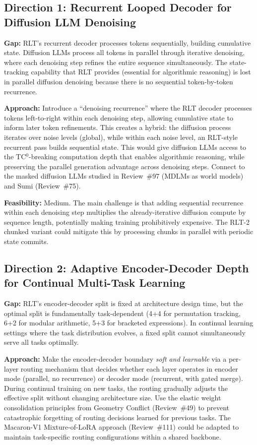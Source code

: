 \documentclass[11pt,a4paper]{article}
\begin{document}
\subsection{Direction 1: Recurrent Looped Decoder for Diffusion LLM Denoising}
\textbf{Gap:} RLT's recurrent decoder processes tokens sequentially, building cumulative state. Diffusion LLMs process all tokens in parallel through iterative denoising, where each denoising step refines the entire sequence simultaneously. The state-tracking capability that RLT provides (essential for algorithmic reasoning) is lost in parallel diffusion denoising because there is no sequential token-by-token recurrence.

\textbf{Approach:} Introduce a ``denoising recurrence'' where the RLT decoder processes tokens left-to-right within each denoising step, allowing cumulative state to inform later token refinements. This creates a hybrid: the diffusion process iterates over noise levels (global), while within each noise level, an RLT-style recurrent pass builds sequential state. This would give diffusion LLMs access to the TC$^0$-breaking computation depth that enables algorithmic reasoning, while preserving the parallel generation advantage across denoising steps. Connect to the masked diffusion LLMs studied in Review~\#97 (MDLMs as world models) and Sumi (Review~\#75).

\textbf{Feasibility:} Medium. The main challenge is that adding sequential recurrence within each denoising step multiplies the already-iterative diffusion compute by sequence length, potentially making training prohibitively expensive. The RLT-2 chunked variant could mitigate this by processing chunks in parallel with periodic state commits.

\subsection{Direction 2: Adaptive Encoder-Decoder Depth for Continual Multi-Task Learning}
\textbf{Gap:} RLT's encoder-decoder split is fixed at architecture design time, but the optimal split is fundamentally task-dependent (4+4 for permutation tracking, 6+2 for modular arithmetic, 5+3 for bracketed expressions). In continual learning settings where the task distribution evolves, a fixed split cannot simultaneously serve all tasks optimally.

\textbf{Approach:} Make the encoder-decoder boundary \emph{soft and learnable} via a per-layer routing mechanism that decides whether each layer operates in encoder mode (parallel, no recurrence) or decoder mode (recurrent, with gated merge). During continual training on new tasks, the routing gradually adjusts the effective split without changing architecture size. Use the elastic weight consolidation principles from Geometry Conflict (Review~\#49) to prevent catastrophic forgetting of routing decisions learned for previous tasks. The Macaron-V1 Mixture-of-LoRA approach (Review~\#111) could be adapted to maintain task-specific routing configurations within a shared backbone.
\end{document}
